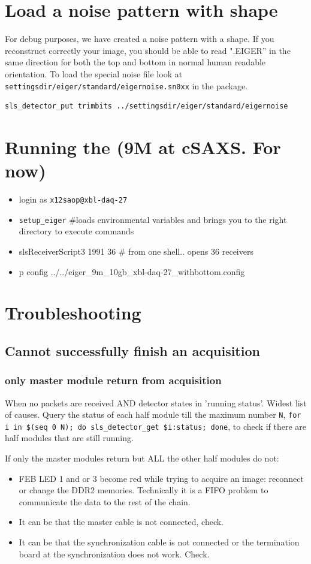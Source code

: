 \documentclass{article}
\begin{document}
\section{Load a noise pattern with shape}
For debug purposes, we have created a noise pattern with a shape. If you reconstruct correctly your image, you should be able to read ".EIGER'' in the same direction for both the top and bottom in normal human readable orientation.
To load the special noise file look at {\tt{settingsdir/eiger/standard/eigernoise.sn0xx}} in the package. 
\begin{verbatim}
sls_detector_put trimbits ../settingsdir/eiger/standard/eigernoise
\end{verbatim}

\section{Running the (9M at cSAXS. For now)}
\begin{itemize}
\item login as {\tt{x12saop@xbl-daq-27}}
\item {\tt{setup\_eiger}} \#loads environmental variables and brings you to the right directory to execute commands
\item slsReceiverScript3 1991 36 \# from one shell.. opens 36 receivers
\item p config ../../eiger\_9m\_10gb\_xbl-daq-27\_withbottom.config
\end{itemize}

\section{Troubleshooting}
\subsection{Cannot successfully finish an acquisition}
\subsubsection{only master module return from acquisition}
When no packets are received AND detector states in 'running status'. Widest list of causes. 
Query the status of each half module till the maximum number {\tt{N}},  {\tt{for i in \$(seq\ 0\ N); do sls\_detector\_get \$i:status; done}}, to check if there are half modules that are still running.

If only the master modules return but ALL the other half modules do not: 
\begin{itemize}
\item FEB LED 1 and or 3 become red while trying to acquire an image: reconnect or change the DDR2 memories. Technically it is a FIFO problem to communicate the data to the rest of the chain. 
\item It can be that the master cable is not connected, check.
\item It can be that the synchronization cable is not connected or the termination board at the synchronization does not work. Check.
\end{itemize}
\end{document}
